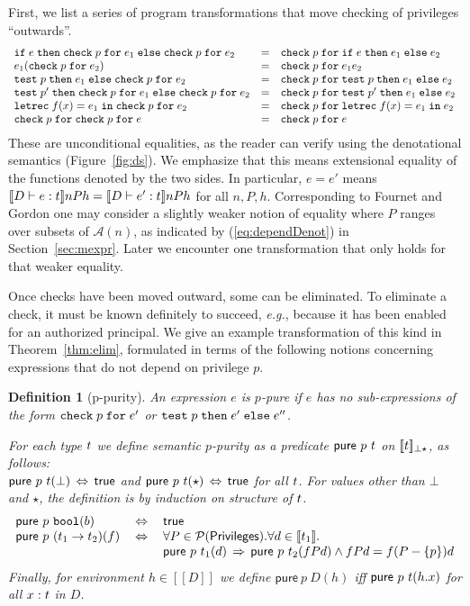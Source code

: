\documentclass[submission,copyright,creativecommons]{eptcs}
\newcommand{\eg}{{\em e.g.}}
\newcommand{\ifthenelse}[3]{\IF\;#1\;\THEN\;#2\;\ELSE\;#3}
\newcommand{\chk}[2]{\CHK\;#1\;\FOR\;#2}
\newcommand{\test}[3]{\TEST\;#1\;\THEN\;#2\;\ELSE\;#3}
\newcommand{\BOOL}{\mbox{\texttt{bool}}}
\newcommand{\ELSE}{\mbox{\texttt{else}}}
\newcommand{\IF}{\mbox{\texttt{if}}}
\newcommand{\FOR}{\mbox{\texttt{for}}}
\newcommand{\IN}{\mbox{\texttt{in}}}
\newcommand{\LET}{\mbox{\texttt{let}}}
\newcommand{\REC}{{\texttt{rec}}}
\newcommand{\THEN}{{\texttt{then}}}
\newcommand{\A}{\mathcal{A}}
\renewcommand{\P}{\mathcal{P}}
\newcommand{\ldb}{[\![}
\newcommand{\rdb}{]\!]}
\newcommand{\means}[1]{\ldb {#1}\rdb}
\newcommand{\proves}{\vdash}
\newcommand{\recdecl}[3]{\REC\;#1(#2) = #3}
\newcommand{\PRIV}{{\mathsf{Privileges}}}
\newcommand{\CHK}{\mbox{\texttt{check}}}
\newcommand{\TEST}{\mbox{\texttt{test}}}
\newcommand{\pure}{\textsf{pure}}
\newcommand{\letdecl}[2]{\LET#1\;\IN\;#2}
\newcommand{\n}{n} \newcommand{\p}{p} \newcommand{\Ps}{\Pi} \newcommand{\h}{h}
\renewcommand{\implies}{\mathbin{\:\Rightarrow\:}}
\renewcommand{\iff}{\mathbin{\:\Leftrightarrow\:}}
\newtheorem{definition}[theorem]{Definition}
\begin{document}
First, we list a series of program transformations that move checking of 
privileges ``outwards''.
\[
\begin{array}{lcl}
\ifthenelse{e}{\chk{\p}{e_1}}{\chk{\p}{e_2}}
&=&
\chk{\p}{\ifthenelse{e}{e_1}{e_2}}\\
e_1(\chk{\p}{e_2}) 
&=&
\chk{\p}{e_1e_2}\\
\test{\p}{e_1}{\chk{\p}{e_2}}
&=&
\chk{\p}{\test{\p}{e_1}{e_2}}\\
\test{\p'}{\chk{\p}{e_1}}{\chk{\p}{e_2}}
&=&
\chk{\p}{\test{\p'}{e_1}{e_2}}\\
\letdecl{\recdecl{f}{x}{e_1}}{\chk{\p}{e_2}}
&=&
\chk{\p}{\letdecl{\recdecl{f}{x}{e_1}}{e_2}}\\
\chk{\p}{\chk{\p}{e}}
&=&
\chk{\p}{e} 
\end{array}
\]
These are unconditional equalities, as the reader can verify using the denotational
semantics (Figure~\ref{fig:ds}).
We emphasize that this means extensional equality of the functions denoted by the two sides.  
In particular, $e=e'$ means 
$\means{D\proves e:\ty}\n P \h =
 \means{D\proves e':\ty}\n P \h$ for all $\n,P,\h$.
Corresponding to Fournet and Gordon one may consider a slightly weaker notion of equality where $P$ ranges over subsets of $\A(\n)$, as indicated by (\ref{eq:dependDenot}) in Section~\ref{sec:mexpr}.
Later we encounter one transformation that only holds for that weaker equality.

Once checks have been moved outward, some can be eliminated.
To eliminate a check, it must be known definitely to succeed, \eg, because it has been
enabled for an authorized principal.  We give an example transformation of this
kind in Theorem~\ref{thm:elim}, formulated in terms of the following notions
concerning expressions that do not depend on privilege $\p$.

\begin{definition}[p-purity]
\begin{sloppypar}
An expression $e$ is $\p$-pure if $e$ has no sub-expressions of the form
$\chk{\p}{e'}$ or $\test{\p}{e'}{e''}$.  
\end{sloppypar}

For each type $t$ we define semantic $\p$-purity as a predicate 
$\pure~\p~{\ty}$ on $\means{\ty}_{\bot\star}$,  as follows: \\
$\pure~\p~{\ty}(\bot) \iff \mathsf{true}$ and 
$\pure~\p~{\ty}(\star) \iff \mathsf{true}$
for all $t$.  For values other than $\bot$ and $\star$, the definition is by
induction on structure of $t$.
\[
\begin{array}{lcl}
\pure~\p~ {\BOOL}(b) &\iff & \mathsf{true} \\
\pure~\p~(\ty_1\to \ty_2)(f) &\iff &
\forall P\in\P(\PRIV) .\forall d\in\means{\ty_1} .\; \\
&& \pure~\p~ {\ty_1}(d)\implies \pure~\p~ {\ty_2}(f P d)
\land f P d = f (P-\{\p\}) d 
\end{array}
\]
Finally, for environment $h\in\means{D}$ we define
$\pure~\p~D(\h)$ iff $\pure~\p~\ty(\h.x)$ for all $x:t$ in $D$.
\end{definition}
\end{document}
